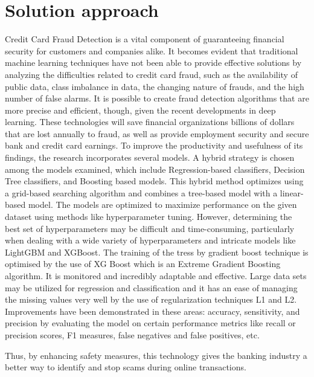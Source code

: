 \section{Solution approach}
\label{sec:intro_sol} %
Credit Card Fraud Detection is a vital component of guaranteeing financial security for customers and companies alike. It becomes evident that traditional machine learning techniques have not been able to provide effective solutions by analyzing the difficulties related to credit card fraud, such as the availability of public data, class imbalance in data, the changing nature of frauds, and the high number of false alarms. It is possible to create fraud detection algorithms that are more precise and efficient, though, given the recent developments in deep learning. These technologies will save financial organizations billions of dollars that are lost annually to fraud, as well as provide employment security and secure bank and credit card earnings. To improve the productivity and usefulness of its findings, the research incorporates several models. A hybrid strategy is chosen among the models examined, which include Regression-based classifiers, Decision Tree classifiers, and Boosting based models. This hybrid method optimizes using a grid-based searching algorithm and combines a tree-based model with a linear-based model. The models are optimized to maximize performance on the given dataset using methods like hyperparameter tuning. However, determining the best set of hyperparameters may be difficult and time-consuming, particularly when dealing with a wide variety of hyperparameters and intricate models like LightGBM and XGBoost. The training of the tress by gradient boost technique is optimised by the use of XG Boost which is an Extreme Gradient Boosting algorithm. It is monitored and incredibly adaptable and effective. Large data sets may be utilized for regression and classification and it has an ease of managing the missing values very well by the use of regularization techniques L1 and L2. Improvements have been demonstrated in these areas: accuracy, sensitivity, and precision by evaluating the model on certain performance metrics like recall or precision scores, F1 measures, false negatives and false positives, etc. 

Thus, by enhancing safety measures, this technology gives the banking industry a better way to identify and stop scams during online transactions.

